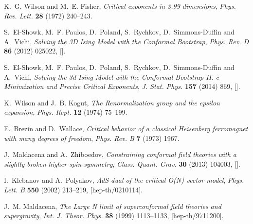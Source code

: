 
\providecommand{\href}[2]{#2}\begingroup\raggedright\begin{thebibliography}{10}

K.~G. Wilson and M.~E. Fisher, \emph{{Critical exponents in 3.99 dimensions}},
  \href{http://dx.doi.org/10.1103/PhysRevLett.28.240}{\emph{Phys. Rev. Lett.}
  {\bfseries 28} (1972) 240--243}.

S.~El-Showk, M.~F. Paulos, D.~Poland, S.~Rychkov, D.~Simmons-Duffin and
  A.~Vichi, \emph{{Solving the 3D Ising Model with the Conformal Bootstrap}},
  \href{http://dx.doi.org/10.1103/PhysRevD.86.025022}{\emph{Phys. Rev. D}
  {\bfseries 86} (2012) 025022},
  [\href{https://arxiv.org/abs/1203.6064}{{}}].

S.~El-Showk, M.~F. Paulos, D.~Poland, S.~Rychkov, D.~Simmons-Duffin and
  A.~Vichi, \emph{{Solving the 3d Ising Model with the Conformal Bootstrap II.
  c-Minimization and Precise Critical Exponents}},
  \href{http://dx.doi.org/10.1007/s10955-014-1042-7}{\emph{J. Stat. Phys.}
  {\bfseries 157} (2014) 869},
  [\href{https://arxiv.org/abs/1403.4545}{{}}].

K.~Wilson and J.~B. Kogut, \emph{{The Renormalization group and the epsilon
  expansion}},
  \href{http://dx.doi.org/10.1016/0370-1573(74)90023-4}{\emph{Phys. Rept.}
  {\bfseries 12} (1974) 75--199}.

E.~Brezin and D.~Wallace, \emph{{Critical behavior of a classical Heisenberg
  ferromagnet with many degrees of freedom}},
  \href{http://dx.doi.org/10.1103/PhysRevB.7.1967}{\emph{Phys. Rev. B}
  {\bfseries 7} (1973) 1967}.

J.~Maldacena and A.~Zhiboedov, \emph{{Constraining conformal field theories
  with a slightly broken higher spin symmetry}},
  \href{http://dx.doi.org/10.1088/0264-9381/30/10/104003}{\emph{Class. Quant.
  Grav.} {\bfseries 30} (2013) 104003},
  [\href{https://arxiv.org/abs/1204.3882}{{}}].

I.~Klebanov and A.~Polyakov, \emph{{AdS dual of the critical O(N) vector
  model}}, \href{http://dx.doi.org/10.1016/S0370-2693(02)02980-5}{\emph{Phys.
  Lett. B} {\bfseries 550} (2002) 213--219},
  [\href{https://arxiv.org/abs/hep-th/0210114}{{\ttfamily hep-th/0210114}}].

J.~M. Maldacena, \emph{{The Large N limit of superconformal field theories and
  supergravity}}, \href{http://dx.doi.org/10.1023/A:1026654312961}{\emph{Int.
  J. Theor. Phys.} {\bfseries 38} (1999) 1113--1133},
  [\href{https://arxiv.org/abs/hep-th/9711200}{{\ttfamily hep-th/9711200}}].


\end{thebibliography}
